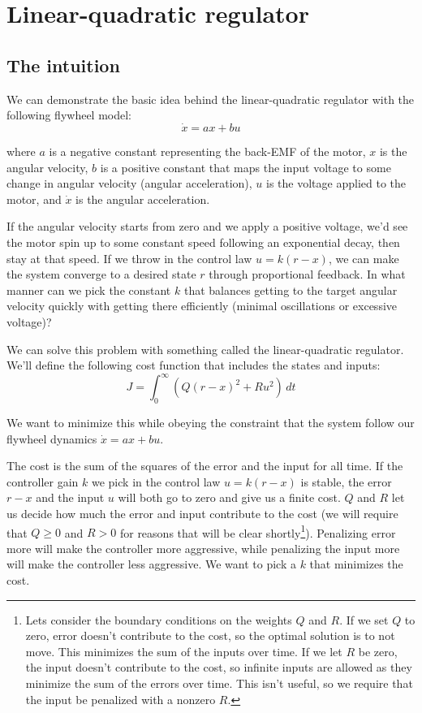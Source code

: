\section{Linear-quadratic regulator} \label{sec:lqr}

\subsection{The intuition}

We can demonstrate the basic idea behind the linear-quadratic regulator with the
following flywheel model:
\begin{equation*}
  \dot{x} = ax + bu
\end{equation*}

where $a$ is a negative constant representing the back-EMF of the motor, $x$ is
the angular velocity, $b$ is a positive constant that maps the input voltage to
some change in angular velocity (angular acceleration), $u$ is the voltage
applied to the motor, and $\dot{x}$ is the angular acceleration.

If the angular velocity starts from zero and we apply a positive voltage, we'd
see the motor spin up to some constant speed following an exponential decay,
then stay at that speed. If we throw in the control law $u = k(r - x)$, we can
make the system converge to a desired state $r$ through proportional feedback.
In what manner can we pick the constant $k$ that balances getting to the target
angular velocity quickly with getting there efficiently (minimal oscillations or
excessive voltage)?

We can solve this problem with something called the linear-quadratic regulator.
We'll define the following cost function that includes the states and inputs:
\begin{equation*}
  J = \int_0^\infty (Q(r - x)^2 + Ru^2) \,dt
\end{equation*}

We want to minimize this while obeying the constraint that the system follow our
flywheel dynamics $\dot{x} = ax + bu$.

The cost is the sum of the squares of the error and the input for all time. If
the controller gain $k$ we pick in the control law $u = k(r - x)$ is stable, the
error $r - x$ and the input $u$ will both go to zero and give us a finite cost.
$Q$ and $R$ let us decide how much the error and input contribute to the cost
(we will require that $Q \geq 0$ and $R > 0$ for reasons that will be clear
shortly\footnote{Lets consider the boundary conditions on the weights $Q$ and
$R$. If we set $Q$ to zero, error doesn't contribute to the cost, so the optimal
solution is to not move. This minimizes the sum of the inputs over time. If we
let $R$ be zero, the input doesn't contribute to the cost, so infinite inputs
are allowed as they minimize the sum of the errors over time. This isn't useful,
so we require that the input be penalized with a nonzero $R$.}). Penalizing
error more will make the controller more aggressive, while penalizing the input
more will make the controller less aggressive. We want to pick a $k$ that
minimizes the cost.

